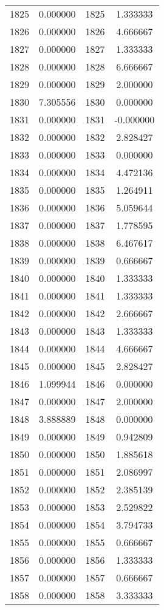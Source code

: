 \documentclass[12pt]{article}
\begin{document}
\begin{longtable}{@{}cccc@{}}
1825 & 0.000000 & 1825 & 1.333333 \\
1826 & 0.000000 & 1826 & 4.666667 \\
1827 & 0.000000 & 1827 & 1.333333 \\
1828 & 0.000000 & 1828 & 6.666667 \\
1829 & 0.000000 & 1829 & 2.000000 \\
1830 & 7.305556 & 1830 & 0.000000 \\
1831 & 0.000000 & 1831 & -0.000000 \\
1832 & 0.000000 & 1832 & 2.828427 \\
1833 & 0.000000 & 1833 & 0.000000 \\
1834 & 0.000000 & 1834 & 4.472136 \\
1835 & 0.000000 & 1835 & 1.264911 \\
1836 & 0.000000 & 1836 & 5.059644 \\
1837 & 0.000000 & 1837 & 1.778595 \\
1838 & 0.000000 & 1838 & 6.467617 \\
1839 & 0.000000 & 1839 & 0.666667 \\
1840 & 0.000000 & 1840 & 1.333333 \\
1841 & 0.000000 & 1841 & 1.333333 \\
1842 & 0.000000 & 1842 & 2.666667 \\
1843 & 0.000000 & 1843 & 1.333333 \\
1844 & 0.000000 & 1844 & 4.666667 \\
1845 & 0.000000 & 1845 & 2.828427 \\
1846 & 1.099944 & 1846 & 0.000000 \\
1847 & 0.000000 & 1847 & 2.000000 \\
1848 & 3.888889 & 1848 & 0.000000 \\
1849 & 0.000000 & 1849 & 0.942809 \\
1850 & 0.000000 & 1850 & 1.885618 \\
1851 & 0.000000 & 1851 & 2.086997 \\
1852 & 0.000000 & 1852 & 2.385139 \\
1853 & 0.000000 & 1853 & 2.529822 \\
1854 & 0.000000 & 1854 & 3.794733 \\
1855 & 0.000000 & 1855 & 0.666667 \\
1856 & 0.000000 & 1856 & 1.333333 \\
1857 & 0.000000 & 1857 & 0.666667 \\
1858 & 0.000000 & 1858 & 3.333333 \\

\end{longtable}
\end{document}
